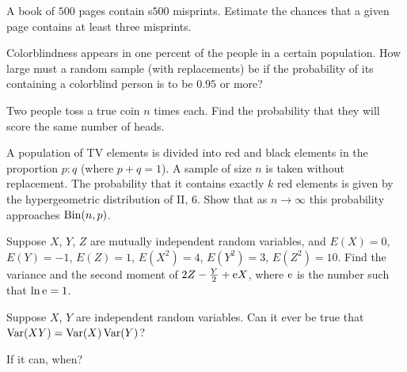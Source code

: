\begin{problem}[Handout 8, \# 13]
  A book of \(500\) pages contain s\(500\) misprints. Estimate the chances
  that a given page contains at least three misprints.
\end{problem}
\begin{solution}
\end{solution}


\begin{problem}[Handout 8, \# 14]
  Colorblindness appears in one percent of the people in a certain
  population. How large must a random sample (with replacements) be if the
  probability of its containing a colorblind person is to be \(0.95\) or
  more?
\end{problem}
\begin{solution}
\end{solution}

\begin{problem}[Handout 8, \# 15]
  Two people toss a true coin \(n\) times each. Find the probability that
  they will score the same number of heads.
\end{problem}
\begin{solution}
\end{solution}

\begin{problem}
  A population of TV elements is divided into red and black elements in the
  proportion \(p:q\) (where \(p+q=1\)). A sample of size \(n\) is taken
  without replacement. The probability that it contains exactly \(k\) red
  elements is given by the hypergeometric distribution of II, 6. Show that
  as \(n\to\infty\) this probability approaches \(\operatorname{Bin}(n,p)\).
\end{problem}
\begin{solution}
\end{solution}

\begin{problem}[Handout 9, \# 3]
  Suppose \(X\), \(Y\), \(Z\) are mutually independent random variables,
  and \(E(X)=0\), \(E(Y)=-1\), \(E(Z)=1\), \(E(X^2)=4\), \(E(Y^2)=3\),
  \(E(Z^2)=10\). Find the variance and the second moment of
  \(2Z-\frac{Y}{2}+\mathrm{e} X\), where \(\mathrm{e}\) is the number such that
  \(\ln \mathrm{e}=1\).
\end{problem}
\begin{solution}
\end{solution}

\begin{problem}
  Suppose \(X\), \(Y\) are independent random variables. Can it ever be
  true that \(\operatorname{Var}(XY)=\operatorname{Var}(X)\operatorname{Var}(Y)\)?

  \noindent If it can, when?
\end{problem}
\begin{solution}
\end{solution}

